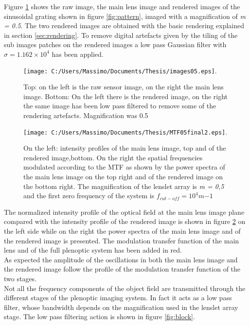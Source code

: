 Figure \ref{fig:image05} shows the raw image, the main lens image and rendered images of the sinusoidal grating shown in figure \ref{fig:pattern}, imaged with a magnification of \textit{m = 0.5}. The two rendered images are obtained with the basic rendering explained in section \ref{sec:rendering}. To remove digital artefacts given by the tiling of the sub images patches on the rendered images a low pass Gaussian filter with $\sigma = 1.162\times 10^4 $ has been applied.   
\begin{figure}[H]
	\centering
	\texttt{[image: C:/Users/Massimo/Documents/Thesis/images05.eps]}.
	\caption{\label{fig:image05} Top: on the left is the raw sensor image, on the right the main lens image. Bottom: On the left there is the  rendered image, on the right the same image has been low pass filtered to remove some of the rendering artefacts. Magnification was 0.5   }
\end{figure}
\begin{figure}[H]
	\centering
	\texttt{[image: C:/Users/Massimo/Documents/Thesis/MTF05final2.eps]}.
	\caption{\label{fig:freq05}  On the left: intensity profiles of the main lens image, top and of the rendered image,bottom. On the right the spatial frequencies modulated according to the MTF as shown by the power spectra of the main lens image on the top right and of the rendered image on the bottom right. The magnification of the lenslet array is \textit{m = 0,5} and  the first zero frequency of the system is $f_{cut-off} = 10^4 m{-1}$}
\end{figure}
The normalized intensity profile of the optical field at the main lens image plane compared with the intensity profile of the rendered image is shown in figure \ref{fig:freq05}  on the left side while on the right the power spectra of the main lens image and of the rendered image is presented. The modulation transfer function of the main lens and of the full plenoptic system has been added in red.  \\
As expected the amplitude of the oscillations in both the main lens image and the rendered image follow the profile of the modulation transfer function of the two stages.  \\
Not all the frequency components of the object field are transmitted through the different stages of the plenoptic imaging system. In fact it acts as a low pass filter, whose bandwidth depends on the magnification used in the lenslet array stage. The low pass filtering action is shown in figure \ref{fig:block}.
\\
